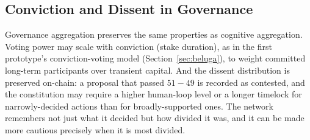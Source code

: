 \subsection{Conviction and Dissent in Governance}

Governance aggregation preserves the same properties as cognitive aggregation. Voting power may scale with conviction (stake duration), as in the first prototype's conviction-voting model (Section~\ref{sec:beluga}), to weight committed long-term participants over transient capital. And the dissent distribution is preserved on-chain: a proposal that passed $51{-}49$ is recorded as contested, and the constitution may require a higher human-loop level or a longer timelock for narrowly-decided actions than for broadly-supported ones. The network remembers not just what it decided but how divided it was, and it can be made more cautious precisely when it is most divided.

